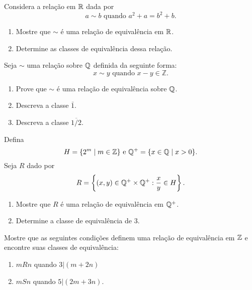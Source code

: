 \documentclass[12pt]{exam}
\begin{document}
    \questao{} Considera a rela\c{c}\~ao em $\mathbb{R}$ dada por
    \[
        a \sim b \mbox{ quando } a^2 + a = b^2 + b.
    \]
    \begin{enumerate}[label={\alph*})]
        \item Mostre que $\sim$ \'e uma rela\c{c}\~ao de equival\^encia em $\mathbb{R}$.
        \item Determine as classes de equival\^encia dessa rela\c{c}\~ao.
    \end{enumerate}

    \vspace{.3cm}

    \questao{} Seja $\sim$ uma rela{\c c}{\~a}o sobre $\mathbb{Q}$ definida da seguinte forma:
    \[
        x \sim y \mbox{ quando } x - y \in \mathbb{Z}.
    \]
    \begin{enumerate}[label={\alph*})]
        \item Prove que $\sim$ {\'e} uma rela{\c c}{\~a}o de equival{\^e}ncia sobre $\mathbb{Q}$.
        \item Descreva a classe $\bar{1}$.
        \item Descreva a classe $\overline{1/2}$.
    \end{enumerate}

    \vspace{.3cm}

    \questao{} Defina
    \[
        H = \{2^m \mid m \in \mathbb{Z}\} \mbox{ e } \mathbb{Q}^+ = \{x \in \mathbb{Q} \mid x > 0\}.
    \]
    Seja $R$ dado por
    \[
        R = \left\{(x,y) \in \mathbb{Q}^+\times \mathbb{Q}^+ : \frac{x}{y} \in H\right\}.
    \]
    \begin{enumerate}[label={\alph*})]
        \item Mostre que $R$ \'e uma rela\c{c}\~ao de equival\^encia em $\mathbb{Q}^+$.
        \item Determine a classe de equival\^encia de $3$.
    \end{enumerate}

    \vspace{.3cm}

    \questao{} Mostre que as seguintes condições definem uma relação de equivalência em $\mathbb{Z}$ e encontre suas classes de equivalência:
    \begin{enumerate}[label={\alph*})]
        \item $mRn$ quando $3 | (m + 2n)$

        \item $mSn$ quando $5 | (2m + 3n)$.
    \end{enumerate}
\end{document}
